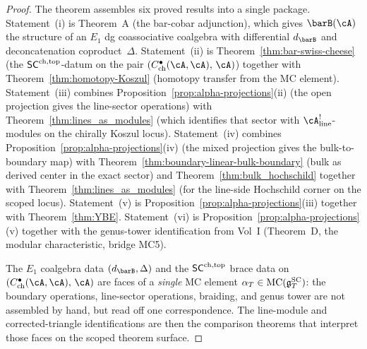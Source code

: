 \begin{proof}
The theorem assembles six proved results into a single package.
Statement~(i) is Theorem~A (the bar-cobar adjunction), which
gives $\barB(\cA)$ the structure of an $E_1$ dg coassociative
coalgebra with differential $d_{\barB}$ and deconcatenation
coproduct~$\Delta$.
Statement~(ii) is Theorem~\ref{thm:bar-swiss-cheese} (the
$\mathsf{SC}^{\mathrm{ch,top}}$-datum on the pair
$(C^\bullet_{\mathrm{ch}}(\cA,\cA),\,\cA)$) together with
Theorem~\ref{thm:homotopy-Koszul} (homotopy transfer from the
MC element).
Statement~(iii) combines
Proposition~\ref{prop:alpha-projections}(ii) (the open projection
gives the line-sector operations) with
Theorem~\ref{thm:lines_as_modules}
\textup{(}which identifies that sector with
$\cA^!_{\mathrm{line}}$-modules on the chirally Koszul
locus\textup{)}.
Statement~(iv) combines
Proposition~\ref{prop:alpha-projections}(iv) (the mixed projection
gives the bulk-to-boundary map) with
Theorem~\ref{thm:boundary-linear-bulk-boundary} (bulk as derived
center in the exact sector) and
Theorem~\ref{thm:bulk_hochschild} together with
Theorem~\ref{thm:lines_as_modules}
\textup{(}for the line-side Hochschild corner on the scoped
locus\textup{)}.
Statement~(v) is Proposition~\ref{prop:alpha-projections}(iii)
together with Theorem~\ref{thm:YBE}.
Statement~(vi) is Proposition~\ref{prop:alpha-projections}(v)
together with the genus-tower identification from Vol~I
(Theorem~D, the modular characteristic, bridge MC5).

The $E_1$ coalgebra data $(d_{\barB},\Delta)$ and the
$\mathsf{SC}^{\mathrm{ch,top}}$ brace data on $(C^\bullet_{\mathrm{ch}}(\cA,\cA),\,\cA)$
are faces of a \emph{single} MC element
$\alpha_T \in \operatorname{MC}(\mathfrak{g}^{\mathrm{SC}}_T)$: the boundary operations, line-sector
operations, braiding, and genus tower are not assembled by hand,
but read off one correspondence. The line-module and
corrected-triangle identifications are then the comparison theorems
that interpret those faces on the scoped theorem surface.
\end{proof}


